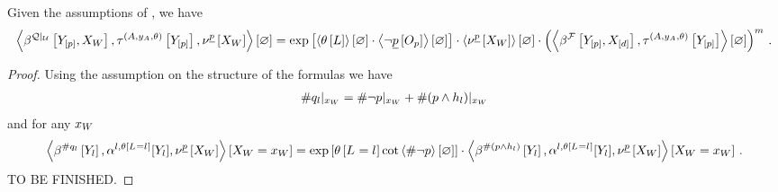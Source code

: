 \begin{lemma}
    \label{lem:FOLpartitionfunctionfactorization}
    Given the assumptions of , we have
    \begin{align*}
        \left\langle 
        \beta^{{\mathcal{Q}}|_{\mathcal{U}}}\left[Y_{[p]},X_{W}\right],\tau^{(A,y_{A},\theta)}\left[Y_{[p]}\right],\nu^{\underline{p}}\left[X_{W}\right]
        \right\rangle \left[ \varnothing \right]
        = \mathrm{exp}\left[\left\langle \theta\left[L\right]\right\rangle \left[ \varnothing \right]\cdot\left\langle \lnot\underline{p}\left[O_{p}\right]\right\rangle \left[ \varnothing \right]\right] \cdot \left\langle \nu^{\underline{p}}\left[X_{W}\right]\right\rangle \left[ \varnothing \right] \cdot \left(
            \left\langle \beta^{\mathcal{F}}\left[Y_{[p]},X_{[d]}\right],\tau^{(A,y_{A},\theta)}\left[Y_{[p]}\right]\right\rangle \left[ \varnothing \right]
        \right)^{m} \, .
    \end{align*}
\end{lemma}
\begin{proof}
    Using the assumption on the structure of the formulas we have
    \begin{align*}
        {\#q_{l}}|_{x_{W}}
        = {\#\lnot p}|_{x_{W}} + {\#(p\land h_{l})}|_{x_{W}}
    \end{align*}
    and for any $x_{W}$
    \begin{align*}
        \left\langle \beta^{\#q_{l}}\left[Y_{l}\right],\alpha^{l,\theta\left[L_{}=l_{}\right]}[Y_{l}],\nu^{\underline{p}}\left[X_{W}\right]\right\rangle \left[ X_{W}=x_{W} \right]
        = \mathrm{exp}\left[\theta\left[L_{}=l_{}\right] \cot \left\langle \#\lnot p\right\rangle \left[ \varnothing \right]\right] \cdot
        \left\langle \beta^{\#(p\land h_{l})}\left[Y_{l}\right],\alpha^{l,\theta\left[L_{}=l_{}\right]}[Y_{l}],\nu^{\underline{p}}\left[X_{W}\right]\right\rangle \left[ X_{W}=x_{W} \right] \, .
    \end{align*}
    TO BE FINISHED.
\end{proof}

